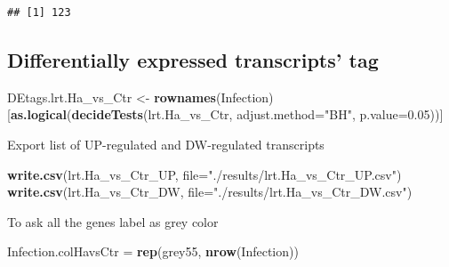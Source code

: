 \documentclass[
]{article}
\newenvironment{Shaded}{\begin{snugshade}}{\end{snugshade}}
\newcommand{\AttributeTok}[1]{\textcolor[rgb]{0.13,0.29,0.53}{#1}}
\newcommand{\DecValTok}[1]{\textcolor[rgb]{0.00,0.00,0.81}{#1}}
\newcommand{\FloatTok}[1]{\textcolor[rgb]{0.00,0.00,0.81}{#1}}
\newcommand{\FunctionTok}[1]{\textcolor[rgb]{0.13,0.29,0.53}{\textbf{#1}}}
\newcommand{\NormalTok}[1]{#1}
\newcommand{\OtherTok}[1]{\textcolor[rgb]{0.56,0.35,0.01}{#1}}
\newcommand{\SpecialCharTok}[1]{\textcolor[rgb]{0.81,0.36,0.00}{\textbf{#1}}}
\newcommand{\StringTok}[1]{\textcolor[rgb]{0.31,0.60,0.02}{#1}}
\begin{document}
\begin{verbatim}
## [1] 123
\end{verbatim}

\begin{Shaded}
\end{Shaded}

\subsection{Differentially expressed transcripts'
tag}\label{differentially-expressed-transcripts-tag}

\begin{Shaded}
\begin{Highlighting}[]
\NormalTok{DEtags.lrt.Ha\_vs\_Ctr }\OtherTok{\textless{}{-}} \FunctionTok{rownames}\NormalTok{(Infection)[}\FunctionTok{as.logical}\NormalTok{(}\FunctionTok{decideTests}\NormalTok{(lrt.Ha\_vs\_Ctr, }\AttributeTok{adjust.method=}\StringTok{"BH"}\NormalTok{, }\AttributeTok{p.value=}\FloatTok{0.05}\NormalTok{))]}
\end{Highlighting}
\end{Shaded}

Export list of UP-regulated and DW-regulated transcripts

\begin{Shaded}
\begin{Highlighting}[]
\FunctionTok{write.csv}\NormalTok{(lrt.Ha\_vs\_Ctr\_UP, }\AttributeTok{file=}\StringTok{"./results/lrt.Ha\_vs\_Ctr\_UP.csv"}\NormalTok{)}
\FunctionTok{write.csv}\NormalTok{(lrt.Ha\_vs\_Ctr\_DW, }\AttributeTok{file=}\StringTok{"./results/lrt.Ha\_vs\_Ctr\_DW.csv"}\NormalTok{)}
\end{Highlighting}
\end{Shaded}

To ask all the genes label as grey color

\begin{Shaded}
\begin{Highlighting}[]
\NormalTok{Infection.colHavsCtr }\OtherTok{=} \FunctionTok{rep}\NormalTok{(}\StringTok{\textquotesingle{}grey55\textquotesingle{}}\NormalTok{, }\FunctionTok{nrow}\NormalTok{(Infection))}
\end{Highlighting}
\end{Shaded}
\end{document}
